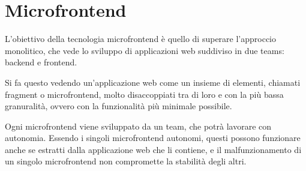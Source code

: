 \chapter{Microfrontend}\label{ch:chapter1}
L'obiettivo della tecnologia microfrontend è quello di superare l'approccio monolitico, che vede
lo sviluppo di applicazioni web suddiviso in due teams: backend e frontend.

Si fa questo vedendo un'applicazione web come un insieme
di elementi, chiamati fragment o microfrontend, molto disaccoppiati tra di loro
e con la più bassa granuralità, ovvero con la funzionalità più minimale possibile.

Ogni microfrontend viene sviluppato da un team, che potrà lavorare con autonomia. 
Essendo i singoli microfrontend autonomi,
questi possono funzionare anche se estratti dalla applicazione web che li contiene,
 e il malfunzionamento di un singolo microfrontend
non compromette la stabilità degli altri.



